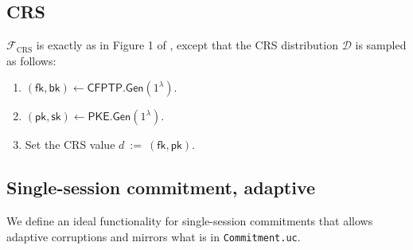 \documentclass[11pt,letterpaper]{article}
\theoremstyle{plain} %
\theoremstyle{definition} %
\theoremstyle{remark} %
\newcommand{\eqdef}{\ {:=} \ }
\newcommand{\SecParam}{\lambda}
\newcommand{\PKE}{\mathsf{PKE}}
\newcommand{\Gen}{\mathsf{Gen}}
\newcommand{\EncKey}{\mathsf{pk}}
\newcommand{\DecKey}{\mathsf{sk}}
\newcommand{\CFPTP}{\mathsf{CFPTP}}
\newcommand{\ForwKey}{\mathsf{fk}}
\newcommand{\BackKey}{\mathsf{bk}}
\newcommand{\IF}{\mathcal{F}} %
\newcommand{\IFCrs}{\IF_{\mathrm{CRS}}}
\newcommand{\CrsDistr}{\mathcal{D}}
\newcommand{\File}[1]{\texttt{#1}}
\begin{document}
\subsection{CRS}
\label{sec:ideal-func-crs}
$\IFCrs$ is exactly as in Figure 1 of \cite{CanettiF01}, except that the CRS distribution $\CrsDistr$ is sampled as follows:
\begin{enumerate}[nolistsep]
	\item $(\ForwKey,\BackKey) \gets \CFPTP.\Gen(1^{\SecParam})$.
	\item $(\EncKey,\DecKey) \gets \PKE.\Gen(1^{\SecParam})$.
	\item Set the CRS value $d \eqdef (\ForwKey, \EncKey)$.
\end{enumerate}

\subsection{Single-session commitment, adaptive}
\label{sec:ideal-func-com}

We define an ideal functionality for single-session commitments that allows adaptive corruptions and mirrors what is in \File{Commitment.uc}.
\newcommand{\EnvCommitReqMsg}{\mathsf{EnvCommitReq}}
\newcommand{\IFCommitReqMsg}{\mathsf{IFCommitReq}}
\newcommand{\SimCommitterCorruptionStatusMsg}{\mathsf{CommitterCorruptionStatus}}
\newcommand{\CommitterBitMsg}{\mathsf{CommitterBit}}
\newcommand{\CommitterCorruptedBit}{\mathsf{corrupted}}
\newcommand{\CommitOkMsg}{\mathsf{CommitOk}}
\end{document}
